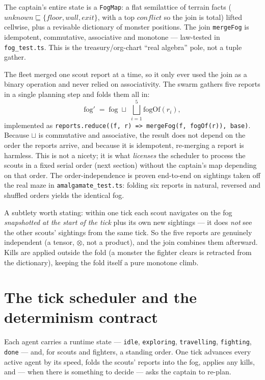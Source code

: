 \documentclass[11pt]{article}
\newcommand{\code}[1]{\texttt{#1}}
\begin{document}
The captain's entire state is a \code{FogMap}: a flat semilattice of terrain facts
($\mathit{unknown} \sqsubseteq \{\mathit{floor},\mathit{wall},\mathit{exit}\}$, with a
top $\mathit{conflict}$ so the join is total) lifted cellwise, plus a revisable
dictionary of monster positions. The join \code{mergeFog} is idempotent, commutative,
associative and monotone --- law-tested in \code{fog\_test.ts}. This is the
treasury/org-chart ``real algebra'' pole, not a tuple gather.

The fleet merged one scout report at a time, so it only ever used the join as a binary
operation and never relied on associativity. The swarm gathers five reports in a single
planning step and folds them all in:
\[
  \mathrm{fog}' \;=\; \mathrm{fog} \;\sqcup\; \bigsqcup_{i=1}^{5} \mathrm{fogOf}(r_i),
\]
implemented as \code{reports.reduce((f, r) => mergeFog(f, fogOf(r)), base)}.
Because $\sqcup$ is commutative and associative, the result does not depend on the
order the reports arrive, and because it is idempotent, re-merging a report is
harmless. This is not a nicety; it is what \emph{licenses} the scheduler to process the
scouts in a fixed serial order (next section) without the captain's map depending on
that order. The order-independence is proven end-to-end on sightings taken off the
real maze in \code{amalgamate\_test.ts}: folding six reports in natural, reversed and
shuffled orders yields the identical fog.

A subtlety worth stating: within one tick each scout navigates on the fog
\emph{snapshotted at the start of the tick} plus its own new sightings --- it does
\emph{not} see the other scouts' sightings from the same tick. So the five reports are
genuinely independent (a tensor, $\otimes$, not a product), and the join combines them
afterward. Kills are applied outside the fold (a monster the fighter clears is
retracted from the dictionary), keeping the fold itself a pure monotone climb.

\section{The tick scheduler and the determinism contract}

Each agent carries a runtime state --- \code{idle}, \code{exploring},
\code{travelling}, \code{fighting}, \code{done} --- and, for scouts and fighters, a
standing order. One tick advances every active agent by its speed, folds the scouts'
reports into the fog, applies any kills, and --- when there is something to decide ---
asks the captain to re-plan.
\end{document}
